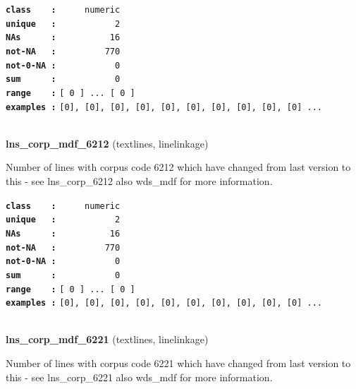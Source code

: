 \documentclass[]{article}
\begin{document}
\textbf{\texttt{class\ \ \ \ :}} \texttt{~~~~~numeric}\\
\textbf{\texttt{unique\ \ \ :}} \texttt{~~~~~~~~~~~2}\\
\textbf{\texttt{NAs\ \ \ \ \ \ :}} \texttt{~~~~~~~~~~16}\\
\textbf{\texttt{not-NA\ \ \ :}} \texttt{~~~~~~~~~770}\\
\textbf{\texttt{not-0-NA\ :}} \texttt{~~~~~~~~~~~0}\\
\textbf{\texttt{sum\ \ \ \ \ \ :}} \texttt{~~~~~~~~~~~0}\\
\textbf{\texttt{range\ \ \ \ :}}
\texttt{{[}\ 0\ {]}\ ...\ {[}\ 0\ {]}}\\
\textbf{\texttt{examples\ :}}
\texttt{{[}0{]},\ {[}0{]},\ {[}0{]},\ {[}0{]},\ {[}0{]},\ {[}0{]},\ {[}0{]},\ {[}0{]},\ {[}0{]},\ {[}0{]}\ ...}\\

~

\textbf{lns\_corp\_mdf\_6212} (textlines, linelinkage)

Number of lines with corpus code 6212 which have changed from last
version to this - see lns\_corp\_6212 also wds\_mdf for more
information.

\textbf{\texttt{class\ \ \ \ :}} \texttt{~~~~~numeric}\\
\textbf{\texttt{unique\ \ \ :}} \texttt{~~~~~~~~~~~2}\\
\textbf{\texttt{NAs\ \ \ \ \ \ :}} \texttt{~~~~~~~~~~16}\\
\textbf{\texttt{not-NA\ \ \ :}} \texttt{~~~~~~~~~770}\\
\textbf{\texttt{not-0-NA\ :}} \texttt{~~~~~~~~~~~0}\\
\textbf{\texttt{sum\ \ \ \ \ \ :}} \texttt{~~~~~~~~~~~0}\\
\textbf{\texttt{range\ \ \ \ :}}
\texttt{{[}\ 0\ {]}\ ...\ {[}\ 0\ {]}}\\
\textbf{\texttt{examples\ :}}
\texttt{{[}0{]},\ {[}0{]},\ {[}0{]},\ {[}0{]},\ {[}0{]},\ {[}0{]},\ {[}0{]},\ {[}0{]},\ {[}0{]},\ {[}0{]}\ ...}\\

~

\textbf{lns\_corp\_mdf\_6221} (textlines, linelinkage)

Number of lines with corpus code 6221 which have changed from last
version to this - see lns\_corp\_6221 also wds\_mdf for more
information.
\end{document}
